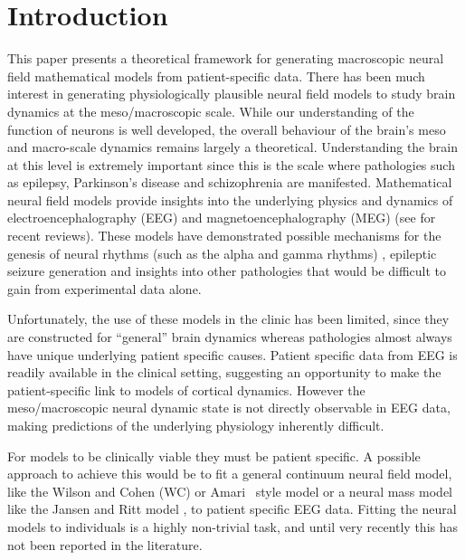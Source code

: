 \documentclass[12pt]{iopart}
\begin{document}
\section{Introduction} This paper presents a theoretical framework for generating macroscopic neural field mathematical models from patient-specific data. There has been much interest in generating physiologically plausible neural field models to study brain dynamics at the meso/macroscopic scale. While our understanding of the function of neurons is well developed, the overall behaviour of the brain's meso and macro-scale dynamics remains largely a theoretical. Understanding the brain at this level is extremely important since this is the scale where pathologies such as epilepsy, Parkinson's disease and schizophrenia are manifested. Mathematical neural field models provide insights into the underlying physics and dynamics of electroencephalography (EEG) and magnetoencephalography (MEG) (see \cite{Deco2008,David2003} for recent reviews). These models have demonstrated possible mechanisms for the genesis of neural rhythms (such as the alpha and gamma rhythms) \cite{Liley1999,RENNIE2000}, epileptic seizure generation \cite{DaSilva2003,Suffczynski2004,Wendling2005} and insights into other pathologies \cite{Moran2008,Schiff2009} that would be difficult to gain from experimental data alone. 

Unfortunately, the use of these models in the clinic has been limited, since they are constructed for ``general'' brain dynamics whereas pathologies almost always have unique underlying patient specific causes. Patient specific data from EEG is readily available in the clinical setting, suggesting an opportunity to make the patient-specific link to models of cortical dynamics. However the meso/macroscopic neural dynamic state is not directly observable in EEG data, making predictions of the underlying physiology inherently difficult.

For models to be clinically viable they must be patient specific. A possible approach to achieve this would be to fit a general continuum neural field model, like the Wilson and Cohen (WC) or Amari~\cite{Wilson1973,Amari1977} style model or a neural mass model like the Jansen and Ritt model \cite{Jansen1995}, to patient specific EEG data. Fitting the neural models to individuals is a highly non-trivial task, and until very recently this has not been reported in the literature. 
\end{document}
